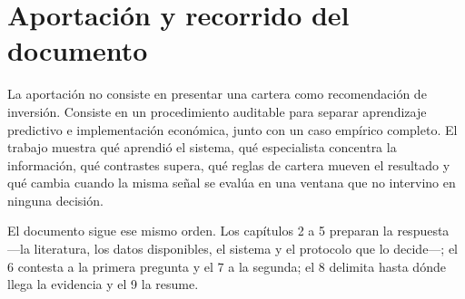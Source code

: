 \section{Aportación y recorrido del documento}

La aportación no consiste en presentar una cartera como recomendación de inversión. Consiste en un
procedimiento auditable para separar aprendizaje predictivo e implementación económica, junto con
un caso empírico completo. El trabajo muestra qué aprendió el sistema, qué especialista concentra la
información, qué contrastes supera, qué reglas de cartera mueven el resultado y qué cambia cuando la
misma señal se evalúa en una ventana que no intervino en ninguna decisión.

El documento sigue ese mismo orden. Los capítulos 2 a 5 preparan la respuesta ---la literatura, los
datos disponibles, el sistema y el protocolo que lo decide---; el 6 contesta a la primera pregunta y
el 7 a la segunda; el 8 delimita hasta dónde llega la evidencia y el 9 la resume.


